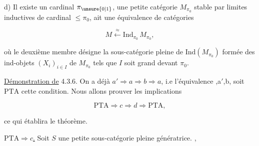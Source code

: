 

d) Il existe un cardinal $\pi_{\unsure{0|1}}$, une petite catégorie $M_{\pi_0}$ stable par limites inductives de cardinal $\leq\pi_0$,   ait une équivalence de catégories

\[
M\overset{\approx}{\longleftarrow}\mathrm{Ind}_{\pi_0}\,M_{\pi_0},
\tag*{(4.3.6.1)}
\]

où le deuxième membre désigne la sous-catégorie pleine de $\mathrm{Ind}(M_{\pi_0})$ formée des  ind-objets $(X_i)_{i\in I}$ de $M_{\pi_0}$ tels que $I$ soit grand devant $\pi_0$.

\uline{Démonstration de} 4.3.6. On a déjà $a'\Rightarrow a\Rightarrow b\Rightarrow a$, i.e l'équivalence ,a$'$,b, soit $\mathrm{PTA}$ cette condition. Nous allons prouver les implications


\[
\mathrm{PTA}\Longrightarrow c\Longrightarrow d\Longrightarrow\mathrm{PTA},
\]

ce qui établira le théorème.

 \uline{$\mathrm{PTA}\Longrightarrow c$.} Soit $S$ une petite sous-catégorie pleine  génératrice.  , 

